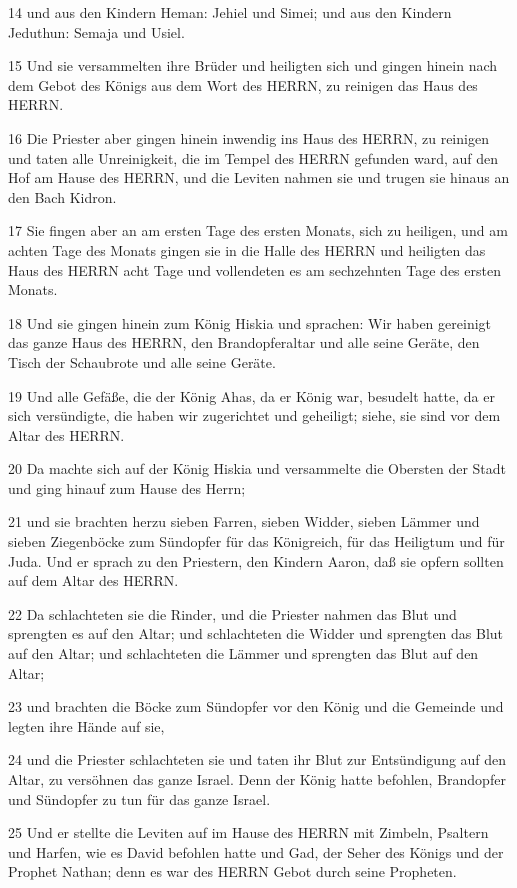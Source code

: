 \par 14 und aus den Kindern Heman: Jehiel und Simei; und aus den Kindern Jeduthun: Semaja und Usiel.
\par 15 Und sie versammelten ihre Brüder und heiligten sich und gingen hinein nach dem Gebot des Königs aus dem Wort des HERRN, zu reinigen das Haus des HERRN.
\par 16 Die Priester aber gingen hinein inwendig ins Haus des HERRN, zu reinigen und taten alle Unreinigkeit, die im Tempel des HERRN gefunden ward, auf den Hof am Hause des HERRN, und die Leviten nahmen sie und trugen sie hinaus an den Bach Kidron.
\par 17 Sie fingen aber an am ersten Tage des ersten Monats, sich zu heiligen, und am achten Tage des Monats gingen sie in die Halle des HERRN und heiligten das Haus des HERRN acht Tage und vollendeten es am sechzehnten Tage des ersten Monats.
\par 18 Und sie gingen hinein zum König Hiskia und sprachen: Wir haben gereinigt das ganze Haus des HERRN, den Brandopferaltar und alle seine Geräte, den Tisch der Schaubrote und alle seine Geräte.
\par 19 Und alle Gefäße, die der König Ahas, da er König war, besudelt hatte, da er sich versündigte, die haben wir zugerichtet und geheiligt; siehe, sie sind vor dem Altar des HERRN.
\par 20 Da machte sich auf der König Hiskia und versammelte die Obersten der Stadt und ging hinauf zum Hause des Herrn;
\par 21 und sie brachten herzu sieben Farren, sieben Widder, sieben Lämmer und sieben Ziegenböcke zum Sündopfer für das Königreich, für das Heiligtum und für Juda. Und er sprach zu den Priestern, den Kindern Aaron, daß sie opfern sollten auf dem Altar des HERRN.
\par 22 Da schlachteten sie die Rinder, und die Priester nahmen das Blut und sprengten es auf den Altar; und schlachteten die Widder und sprengten das Blut auf den Altar; und schlachteten die Lämmer und sprengten das Blut auf den Altar;
\par 23 und brachten die Böcke zum Sündopfer vor den König und die Gemeinde und legten ihre Hände auf sie,
\par 24 und die Priester schlachteten sie und taten ihr Blut zur Entsündigung auf den Altar, zu versöhnen das ganze Israel. Denn der König hatte befohlen, Brandopfer und Sündopfer zu tun für das ganze Israel.
\par 25 Und er stellte die Leviten auf im Hause des HERRN mit Zimbeln, Psaltern und Harfen, wie es David befohlen hatte und Gad, der Seher des Königs und der Prophet Nathan; denn es war des HERRN Gebot durch seine Propheten.
